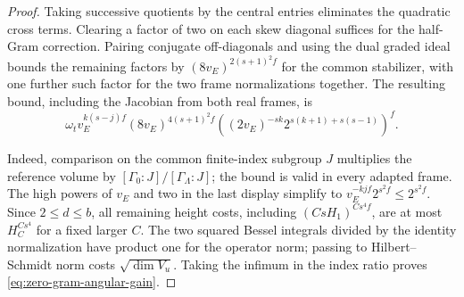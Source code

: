\begin{proof}
Taking successive quotients by the central entries eliminates the quadratic cross terms. Clearing a factor of two on each skew diagonal suffices for the half-Gram correction. Pairing conjugate off-diagonals and using the dual graded ideal bounds the remaining factors by \((8v_E)^{2(s+1)^2 f}\) for the common stabilizer, with one further such factor for the two frame normalizations together. The resulting bound, including the Jacobian from both real frames, is
\[
  \omega_t v_E^{k(s-j)f}(8v_E)^{4(s+1)^2f}
  \left((2v_E)^{-sk}2^{s(k+1)+s(s-1)}\right)^f .
\]


Indeed, comparison on the common finite-index subgroup \(J\) multiplies the reference volume by \([\Gamma_0:J]/[\Gamma_\Lambda:J]\); the bound is valid in every adapted frame. The high powers of \(v_E\) and two in the last display simplify to \(v_E^{-kjf}2^{s^2f}\le2^{s^2f}\). Since \(2\le d\le b\), all remaining height costs, including \((CsH_1)^{Cs^4f}\), are at most \(H_C^{Cs^4}\) for a fixed larger \(C\). The two squared Bessel integrals divided by the identity normalization have product one for the operator norm; passing to Hilbert--Schmidt norm costs \(\sqrt{\dim V_u}\). Taking the infimum in the index ratio proves \eqref{eq:zero-gram-angular-gain}.
\end{proof}



